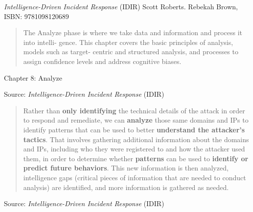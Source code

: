 \documentclass[Screen16to9,17pt]{foils}
\begin{document}






\emph{Intelligence-Driven Incident Response} (IDIR)
 Scott Roberts. Rebekah Brown, ISBN: 9781098120689

\begin{quote}
The Analyze phase is where we take data and information and process it into intelli‐
gence. This chapter covers the basic principles of analysis, models such as target-
centric and structured analysis, and processes to assign confidence levels and address
cognitive biases.
\end{quote}

\begin{list2}
\item Chapter 8: Analyze
\end{list2}


Source: \emph{Intelligence-Driven Incident Response} (IDIR)





\begin{quote}
Rather than {\bf only identifying} the technical details of the attack in order to respond and remediate, we can {\bf analyze} those same domains and IPs to identify patterns that can be used to better {\bf understand the attacker’s tactics}. That involves gathering additional information about the domains and IPs, including who they were registered to and how the attacker used them, in order to determine whether {\bf patterns} can be used to {\bf identify or predict future behaviors}. This new information is then analyzed, intelligence gaps (critical pieces of information that are needed to conduct analysis) are identified, and more information is gathered as needed.
\end{quote}
Source: \emph{Intelligence-Driven Incident Response} (IDIR)



\end{document}
